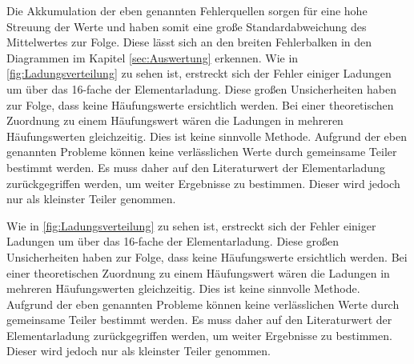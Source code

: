 \noindent Die Akkumulation der eben genannten Fehlerquellen sorgen für eine hohe Streuung der Werte und haben somit 
eine große Standardabweichung des Mittelwertes zur Folge. Diese lässt sich an den breiten Fehlerbalken in den Diagrammen 
im Kapitel \ref{sec:Auswertung} erkennen. Wie in \autoref{fig:Ladungsverteilung} zu sehen ist, erstreckt sich der Fehler 
einiger Ladungen um über das 16-fache der Elementarladung. Diese großen Unsicherheiten haben zur Folge, dass keine 
Häufungswerte ersichtlich werden. Bei einer theoretischen Zuordnung zu einem Häufungswert wären die Ladungen in mehreren 
Häufungswerten gleichzeitig. Dies ist keine sinnvolle Methode. Aufgrund der eben genannten Probleme können keine 
verlässlichen Werte durch gemeinsame Teiler bestimmt werden. Es muss daher auf den Literaturwert der Elementarladung 
zurückgegriffen werden, um weiter Ergebnisse zu bestimmen. Dieser wird jedoch nur als kleinster Teiler genommen. 















Wie in \autoref{fig:Ladungsverteilung} zu sehen ist, erstreckt sich der Fehler einiger Ladungen um über das 16-fache der Elementarladung. 
Diese großen Unsicherheiten haben zur Folge, dass keine Häufungswerte ersichtlich werden. Bei einer theoretischen Zuordnung zu einem Häufungswert wären 
die Ladungen in mehreren Häufungswerten gleichzeitig. Dies ist keine sinnvolle Methode.
Aufgrund der eben genannten Probleme können keine verlässlichen Werte durch gemeinsame Teiler bestimmt werden. Es muss daher auf den 
Literaturwert der Elementarladung zurückgegriffen werden, um weiter Ergebnisse zu bestimmen. Dieser wird jedoch nur als kleinster Teiler genommen. 

